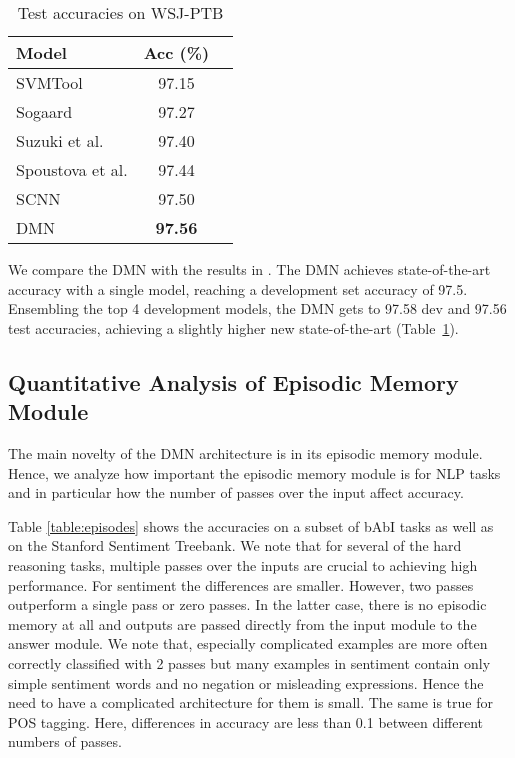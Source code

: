 \documentclass{article}
\begin{document}
\begin{table}[t!]
\centering
\begin{tabular}{l c c}
 \toprule
 Model & Acc (\%) \\
 \midrule
 SVMTool & 97.15 \\
 Sogaard & 97.27 \\
 Suzuki et al. & 97.40 \\
 Spoustova et al. & 97.44 \\
 SCNN & 97.50 \\
 \midrule
 DMN & \textbf{97.56} \\
 \bottomrule
\end{tabular}
\vspace{-0.3cm}
\caption{Test accuracies on WSJ-PTB}
\label{tab:pos}
\vspace{-0.3cm}
\end{table}

We compare the DMN with the results in \cite{Sogaard2011}. The DMN achieves state-of-the-art accuracy with a single model, reaching a development set accuracy of 97.5. Ensembling the top 4 development models, the DMN gets to 97.58 dev and 97.56 test accuracies, achieving a slightly higher new state-of-the-art (Table~\ref{tab:pos}).


\subsection{Quantitative Analysis of Episodic Memory Module}
The main novelty of the DMN architecture is in its episodic memory module. Hence, we analyze how important the episodic memory module is for NLP tasks and in particular how the number of passes over the input affect accuracy. 

Table \ref{table:episodes} shows the accuracies on a subset of bAbI tasks as well as on the Stanford Sentiment Treebank. We note that for several of the hard reasoning tasks, multiple passes over the inputs are crucial to achieving high performance. For sentiment the differences are smaller. However, two passes outperform a single pass or zero passes. In the latter case, there is no episodic memory at all and outputs are passed directly from the input module to the answer module. We note that, especially complicated examples are more often correctly classified with 2 passes but many examples in sentiment contain only simple sentiment words and no negation or misleading expressions. Hence the need to have a complicated architecture for them is small. The same is true for POS tagging. Here, differences in accuracy are less than 0.1 between different numbers of passes.
\end{document}
